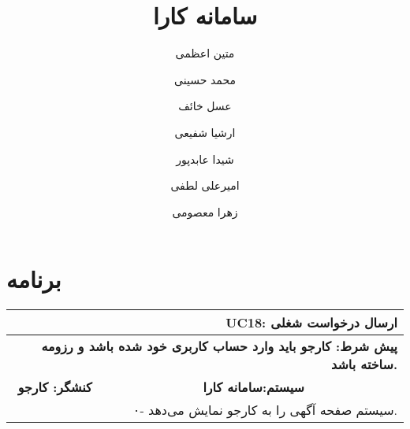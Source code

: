 \documentclass[12pt]{article}
\author{متین اعظمی}
\author{محمد حسینی}
\author{عسل خائف}
\author{ارشیا شفیعی}
\author{شیدا عابدپور}
\author{امیرعلی لطفی}
\author{زهرا معصومی}
\title{سامانه کارا}
\begin{document}
	
	\section{برنامه}
	\begin{table}[]
		\begin{tabular}{|rr|}
			\hline
			\multicolumn{2}{|r|}{\textbf{UC18: ارسال درخواست شغلی}}                                                                                                                                                                                                                                                                                                                                                \\ \hline
			\multicolumn{2}{|r|}{\textbf{پیش شرط: کارجو باید وارد حساب کاربری خود شده باشد و رزومه ساخته باشد.}}                                                                                                                                                                                                                                                                                                                           \\ \hline
			\multicolumn{1}{|c|}{\textbf{کنشگر: کارجو}}                                                                                                                                        & \multicolumn{1}{c|}{\textbf{سیستم:سامانه کارا}}                                                                                                                                                                                           \\ \hline
			\multicolumn{1}{|l|}{\textbf{}}                                                                                                                                                    & ۰- سیستم صفحه آگهی را به کارجو نمایش می‌دهد.                                                                                                                                                                                              \\ \hline

\end{tabular}
\end{table}
\end{document}
